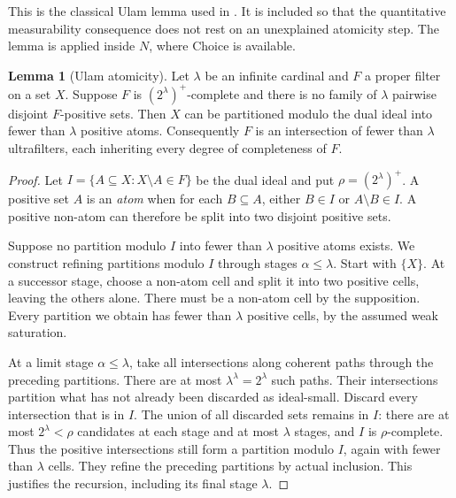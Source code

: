 \documentclass[11pt,letterpaper]{article}
\theoremstyle{definition}
\newtheorem{lemma}[definition]{Lemma}
\numberwithin{equation}{section}
\begin{document}
This is the classical Ulam lemma used in
\cite[Lemma~2.1]{dichotomy}. It is included so that the quantitative
measurability consequence does not rest on an unexplained atomicity
step. The lemma is applied inside $N$, where Choice is available.

\begin{lemma}[Ulam atomicity]\label{lem:atomicity}
Let $\lambda$ be an infinite cardinal and $F$ a proper filter on a set
$X$. Suppose $F$ is $(2^\lambda)^+$-complete and there is no family of
$\lambda$ pairwise disjoint $F$-positive sets. Then $X$ can be
partitioned modulo the dual ideal into fewer than $\lambda$ positive
atoms. Consequently $F$ is an intersection of fewer than $\lambda$
ultrafilters, each inheriting every degree of completeness of $F$.
\end{lemma}
\begin{proof}
Let $I=\{A\subseteq X:X\setminus A\in F\}$ be the dual ideal and
put $\rho=(2^\lambda)^+$. A positive set $A$ is an \emph{atom} when
for each $B\subseteq A$, either $B\in I$ or $A\setminus B\in I$.
A positive non-atom can therefore be split into two disjoint positive
sets.

Suppose no partition modulo $I$ into fewer than $\lambda$ positive
atoms exists. We construct refining partitions modulo $I$ through
stages $\alpha\le\lambda$. Start with $\{X\}$. At a successor stage,
choose a non-atom cell and split it into two positive cells, leaving
the others alone. There must be a non-atom cell by the supposition.
Every partition we obtain has fewer than $\lambda$ positive cells,
by the assumed weak saturation.

At a limit stage $\alpha\le\lambda$, take all intersections along
coherent paths through the preceding partitions. There are at most
$\lambda^\lambda=2^\lambda$ such paths. Their intersections partition
what has not already been discarded as ideal-small. Discard every
intersection that is in $I$. The union of all discarded sets remains
in $I$: there are at most $2^\lambda<\rho$ candidates at each stage
and at most $\lambda$ stages, and $I$ is $\rho$-complete. Thus the
positive intersections still form a partition modulo $I$, again with
fewer than $\lambda$ cells. They refine the preceding partitions by
actual inclusion. This justifies the recursion, including its final
stage $\lambda$.


\end{proof}
\end{document}
